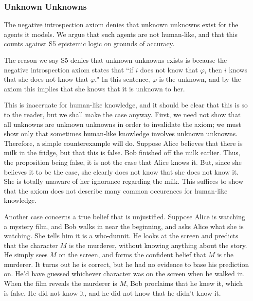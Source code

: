 \subsubsection{Unknown Unknowns}
\label{sec:unkunks}
The negative introspection axiom denies that unknown unknowns exist for the agents it models. We argue that such agents are not human-like, and that this counts against S5 epistemic logic on grounds of accuracy.

The reason we say S5 denies that unknown unknowns exists is because the negative introspection axiom states that ``if $i$ does not know that $\varphi$, then $i$ knows that she does not know that $\varphi$." In this sentence, $\varphi$ is the unknown, and by the axiom this implies that she knows that it is unknown to her. 

This is inaccruate for human-like knowledge, and it should be clear that this is so to the reader, but we shall make the case anyway. First, we need not show that all unknowns are unknown unknowns in order to invalidate the axiom; we must show only that sometimes human-like knowledge involves unknown unknowns. Therefore, a simple counterexample will do. Suppose Alice believes that there is milk in the fridge, but that this is false. Bob finished off the milk earlier. Thus, the proposition being false, it is not the case that Alice knows it. But, since she believes it to be the case, she clearly does not know that she does not know it. She is totally unaware of her ignorance regarding the milk. This suffices to show that the axiom does not describe many common occurences for human-like knowledge.

Another case concerns a true belief that is unjustified. Suppose Alice is watching a mystery film, and Bob walks in near the beginning, and asks Alice what she is watching. She tells him it is a who-dunnit. He looks at the screen and predicts that the character $M$ is the murderer, without knowing anything about the story. He simply sees $M$ on the screen, and forms the confident belief that $M$ is the murderer. It turns out he is correct, but he had no evidence to base his prediction on. He'd have guessed whichever character was on the screen when he walked in. When the film reveals the murderer is $M$, Bob proclaims that he knew it, which is false. He did not know it, and he did not know that he didn't know it.

